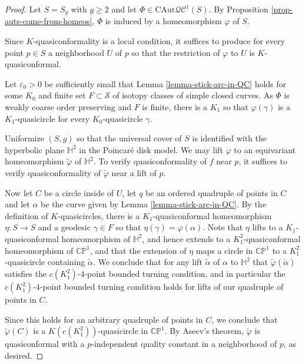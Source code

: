 \documentclass[12pt,a4paper]{amsart}
\newcommand{\bbH}{\mathbb H}
\newcommand{\CP}{\mathbb{CP}}
\theoremstyle{definition}
\theoremstyle{plain}
\numberwithin{equation}{section}
\begin{document}
\begin{proof}
    Let $S = S_g$ with $g \geq 2$ and let $\Phi\in\mathrm{CAut} \mathcal{QC}^{\dagger}(S)$.
    By Proposition \ref{prop-auts-come-from-homeos}, $\Phi$ is induced by a homeomorphism $\varphi$ of $S$.
    
    Since $K$-quasiconformality is a local condition, it suffices to produce for every point $p \in S$ a neighborhood $U$ of $p$ so that the restriction of $\varphi$ to $U$ is $K$-quasiconformal.

    Let $\varepsilon_0>0$ be sufficiently small that Lemma \ref{lemma-stick-arc-in-QC} holds for some $K_0$ and finite set $F \subset \mathscr{S}$ of isotopy classes of simple closed curves.
    As $\Phi$ is weakly coarse order preserving and $F$ is finite, there is a $K_1$ so that $\varphi(\gamma)$ is a $K_1$-quasicircle for every $K_0$-quasicircle $\gamma$.
    

    Uniformize $(S,g)$ so that the universal cover of $S$ is identified with the hyperbolic plane $\bbH^2$ in the Poincar\'e disk model.
    We may lift $\varphi$ to an equivariant homeomorphism $\widetilde{\varphi}$ of $\bbH^2$.
    To verify quasiconformality of $f$ near $p$, it suffices to verify quasiconformality of $\widetilde{\varphi}$ near a lift of $p$.

    Now let $C$ be a circle inside of $U$, let $q$ be an ordered quadruple of points in $C$ and let $\alpha$ be the curve given by Lemma \ref{lemma-stick-arc-in-QC}. 
    By the definition of $K$-quasicircles, there is a $K_1$-quasiconformal homeomorphism $\eta : S \to S$ and a geodesic $\gamma \in F$ so that $\eta(\gamma) = \varphi(\alpha)$.
    Note that $\eta$ lifts to a $K_1$-quasiconformal homeomorphism of $\bbH^2$, and hence extends to a $K_1^2$-quasiconformal homeomorphism of $\CP^1$, and that the extension of $\eta$ maps a circle in $\CP^1$ to a $K_1^2$-quasicircle containing $\widetilde{\alpha}$.
    We conclude that for any lift $\widetilde{\alpha}$ of $\alpha$ to $\bbH^2$ that $\widetilde{\varphi}(\widetilde{\alpha})$ satisfies the $c(K_1^2)$-$4$-point bounded turning condition, and in particular the $c(K_1^2)$-$4$-point bounded turning condition holds for lifts of our quadruple of points in $C$.
    
    Since this holds for an arbitrary quadruple of points in $C$, we conclude that $\widetilde{\varphi}(C)$ is a $K(c(K_1^2))$-quasicircle in $\CP^1$.
    By Aseev's theorem, $\widetilde{\varphi}$ is quasiconformal with a $p$-independent quality constant in a neighborhood of $p$, as desired.
\end{proof}
\end{document}
